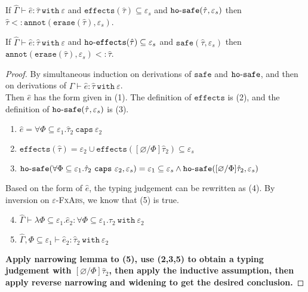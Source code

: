 \documentclass{llncs}
\newcommand{\keywadj}[1]{\mathtt{#1}}
\newcommand{\keyw}[1]{\keywadj{#1}~}
\newcommand{\kw}[1]{\keyw{ #1 }}
\newcommand{\kwa}[1]{\keywadj{ #1 }}
\newcommand{\hyphen}{\hbox{-}}
\newcommand{\fx}[1]{ \kwa{effects}(#1) }
\newcommand{\hofx}[1]{ \kwa{ho \hyphen effects}(#1) }
\newcommand{\safe}[2]{ \kwa{safe}(#1, #2) }
\newcommand{\hosafe}[2]{ \kwa{ho \hyphen safe}(#1, #2) }
\newcommand{\annot}[2]{
	\keywadj{annot}(#1, #2)
}
\newcommand{\erase}[1]{
	\keywadj{erase}(#1)
}
\begin{document}
\hrulefill

\begin{lemma}[Approximation 1]
If $\hat \Gamma \vdash \hat e: \hat \tau~\kw{with} \varepsilon$ and $\fx{\hat \tau} \subseteq \varepsilon_s$ and $\hosafe{\hat \tau}{\varepsilon_s}$ then $\hat \tau <: \annot{\erase{\hat \tau}}{\varepsilon_s}$.
\end{lemma}

\begin{lemma}[Approximation 2]
If $\hat \Gamma \vdash \hat e: \hat \tau~\kw{with} \varepsilon$ and $\hofx{\hat \tau} \subseteq \varepsilon_s$ and $\safe{\hat \tau}{\varepsilon_s}$ then $\annot{\erase{\hat \tau}}{\varepsilon_s} <: \hat \tau$.
\end{lemma}

\begin{proof} By simultaneous induction on derivations of $\kwa{safe}$ and $\kwa{ho \hyphen safe}$, and then on derivations of $\hat \Gamma \vdash \hat e: \hat \tau~\kw{with} \varepsilon$.\\

 Then $\hat e$ has the form given in (1). The definition of $\kwa{effects}$ is (2), and the definition of $\hosafe{\hat \tau}{\varepsilon_s}$ is (3). 

\begin{enumerate}
	\item $\hat e = \forall \Phi \subseteq \varepsilon_1. \hat \tau_2~\kw{caps} \varepsilon_2$
	\item $\fx{\hat \tau} = \varepsilon_2 \cup \fx{[\varnothing/\Phi]\hat \tau_2} \subseteq \varepsilon_s$
	\item $\hosafe{\forall \Phi \subseteq \varepsilon_1. \hat \tau_2~\kw{caps} \varepsilon_2}{\varepsilon_s} = \varepsilon_1 \subseteq \varepsilon_s \land \hosafe{[\varnothing/\Phi]\hat \tau_2}{\varepsilon_s}$
\end{enumerate} 

\noindent
Based on the form of $\hat e$, the typing judgement can be rewritten as (4). By inversion on \textsc{$\varepsilon$-FxAbs}, we know that (5) is true.

\begin{enumerate}
	\setcounter{enumi}{3}
	\item $\hat \Gamma \vdash \lambda \Phi \subseteq \varepsilon_1. \hat e_2 : \forall \Phi \subseteq \varepsilon_1. \hat \tau_2~\kw{with} \varepsilon_2$
	\item $\hat \Gamma, \Phi \subseteq \varepsilon_1 \vdash \hat e_2: \hat \tau_2~\kw{with} \varepsilon_2$
\end{enumerate}

\textbf{Apply narrowing lemma to (5), use (2,3,5) to obtain a typing judgement with $[\varnothing/\Phi]\hat \tau_2$, then apply the inductive assumption, then apply reverse narrowing and widening to get the desired conclusion.}

\end{proof}
\end{document}
